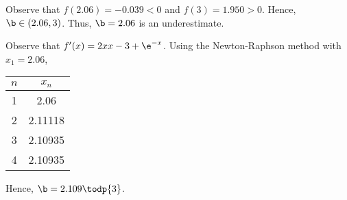 \begin{solution}
\begin{ppart}
        Observe that $f(2.06) = -0.039 < 0$ and $f(3) = 1.950 > 0$. Hence, $\b \in (2.06, 3)$. Thus, $\b = 2.06$ is an underestimate.
    \end{ppart}
    \begin{ppart}
        Observe that $f'(x) = 2x x- 3 + \e^{-x}$. Using the Newton-Raphson method with $x_1 = 2.06$,

        \begin{table}[H]
            \centering
            \begin{tabular}{|c|c|}
            \hline
            $n$ & $x_n$ \\ \hline
            1 & 2.06 \\ \hline
            2 & 2.11118 \\ \hline
            3 & 2.10935 \\ \hline
            4 & 2.10935 \\ \hline
            \end{tabular}
        \end{table}

        Hence, $\b = 2.109 \todp{3}$.
    \end{ppart}
\end{solution}